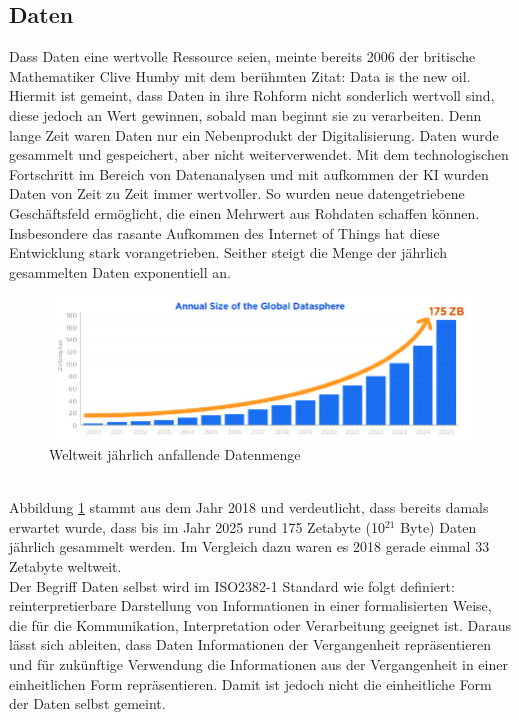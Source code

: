 \begin{onehalfspace}
    \subsection{Daten}
    \label{subsubsec:daten}
    Dass Daten eine wertvolle Ressource seien, meinte bereits 2006 der britische Mathematiker Clive Humby mit dem berühmten Zitat: \glqq{}Data is the new oil\grqq{}.\cite{Frorbes2021} Hiermit ist gemeint, dass Daten in ihre Rohform nicht sonderlich wertvoll sind, diese jedoch an Wert gewinnen, sobald man beginnt sie zu verarbeiten. Denn lange Zeit waren Daten nur ein Nebenprodukt der Digitalisierung. Daten wurde gesammelt und gespeichert, aber nicht weiterverwendet. Mit dem technologischen Fortschritt im Bereich von Datenanalysen und mit aufkommen der \ac{KI} wurden Daten von Zeit zu Zeit immer wertvoller. So wurden neue datengetriebene Geschäftsfeld ermöglicht, die einen Mehrwert aus Rohdaten schaffen können. Insbesondere das rasante Aufkommen des Internet of Things hat diese Entwicklung stark vorangetrieben. Seither steigt die Menge der jährlich gesammelten Daten exponentiell an.\cite{Otto2019}
        \\
        \begin{figure}[h]
            \centering
            \includegraphics[width = 15.5cm]{Bilder/Annual_Data_Size.png}
            \caption{Weltweit jährlich anfallende Datenmenge \cite{Reinsel2018}}
            \label{fig:DataSize}
        \end{figure}
        \\
        Abbildung \ref{fig:DataSize} stammt aus dem Jahr 2018 und verdeutlicht, dass bereits damals erwartet wurde, dass bis im Jahr 2025 rund 175 Zetabyte (10$^{21}$ Byte) Daten jährlich gesammelt werden. Im Vergleich dazu waren es 2018 gerade einmal 33 Zetabyte weltweit.\cite{Reinsel2018}\cite{Taleb2018}
        \\
        Der Begriff Daten selbst wird im ISO2382-1 Standard wie folgt definiert: \glqq{}reinterpretierbare Darstellung von Informationen in einer formalisierten Weise, die für die Kommunikation, Interpretation oder Verarbeitung geeignet ist\grqq{}.\cite{ISO2382} Daraus lässt sich ableiten, dass Daten Informationen der Vergangenheit repräsentieren und für zukünftige Verwendung die Informationen aus der Vergangenheit in einer einheitlichen Form repräsentieren. Damit ist jedoch nicht die einheitliche Form der Daten selbst gemeint. 

\end{onehalfspace}
